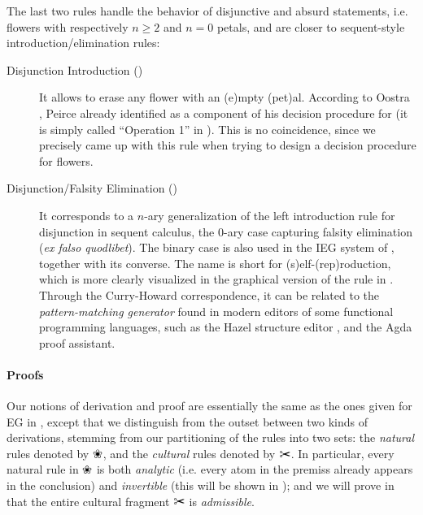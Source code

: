 The last two rules handle the behavior of disjunctive and absurd statements,
i.e. flowers with respectively $n \geq 2$ and $n = 0$ petals, and are closer to
sequent-style introduction/elimination rules:

\begin{description}
  \item[Disjunction Introduction ()]
    It allows to erase any flower with an \textsf{(e)}mpty \textsf{(pet)}al.
    According to Oostra \cite[p.~109]{oostra_advances_2022}, Peirce already
    identified  as a component of his decision procedure for 
    (it is simply called ``Operation 1'' in \cite{oostra_advances_2022}). This is
    no coincidence, since we precisely came up with this rule when trying to
    design a decision procedure for flowers.

  \item[Disjunction/Falsity Elimination ()]
    It corresponds to a $n$-ary generalization of the left introduction rule for
    disjunction in sequent calculus, the $0$-ary case capturing falsity
    elimination (\textit{ex falso quodlibet}). The binary case is also used in
    the IEG system of \cite{minghui_graphical_2019}, together with its converse.
    The name  is short for \textsf{(s)}elf-\textsf{(rep)}roduction,
    which is more clearly visualized in the graphical version of the rule in
    . Through the Curry-Howard correspondence,
    it can be related to the \emph{pattern-matching generator} found in modern
    editors of some functional programming languages, such as the Hazel
    structure editor , and the Agda proof assistant.
\end{description}

\paragraph{Proofs}

Our notions of derivation and proof are essentially the same as the ones given
for EG in , except that we distinguish from the outset between
two kinds of derivations, stemming from our partitioning of the rules into two
sets: the \emph{natural} rules denoted by $\Nature$, and the \emph{cultural}
rules denoted by $\Culture$. In particular, every natural rule in $\Nature$ is
both \emph{analytic} (i.e. every atom in the premiss already appears in the
conclusion) and \emph{invertible} (this will be shown in );
and we will prove in  that the entire cultural fragment
$\Culture$ is \emph{admissible}.

